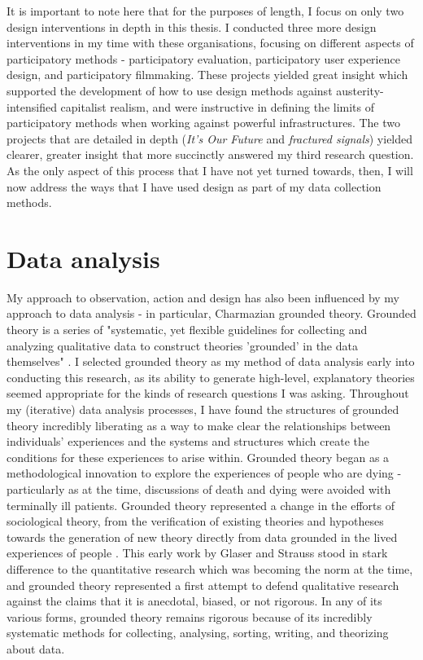 It is important to note here that for the purposes of length, I focus on only two design interventions in depth in this thesis. I conducted three more design interventions in my time with these organisations, focusing on different aspects of participatory methods - participatory evaluation, participatory user experience design, and participatory filmmaking. These projects yielded great insight which supported the development of how to use design methods against austerity-intensified capitalist realism, and were instructive in defining the limits of participatory methods when working against powerful infrastructures. The two projects that are detailed in depth (\textit{It's Our Future} and \textit{fractured signals}) yielded clearer, greater insight that more succinctly answered my third research question. As the only aspect of this process that I have not yet turned towards, then, I will now address the ways that I have used design as part of my data collection methods. 

\section{Data analysis}
\label{sec:3-3-analysis}
My approach to observation, action and design has also been influenced by my approach to data analysis - in particular, Charmazian grounded theory. Grounded theory is a series of "systematic, yet flexible guidelines for collecting and analyzing qualitative data to construct theories 'grounded' in the data themselves" \cite[3]{charmaz_constructing_2006}. I selected grounded theory as my method of data analysis early into conducting this research, as its ability to generate high-level, explanatory theories seemed appropriate for the kinds of research questions I was asking. Throughout my (iterative) data analysis processes, I have found the structures of grounded theory incredibly liberating as a way to make clear the relationships between individuals' experiences and the systems and structures which create the conditions for these experiences to arise within. 
Grounded theory began as a methodological innovation to explore the experiences of people who are dying \citep{glaser_awareness_2017} - particularly as at the time, discussions of death and dying were avoided with terminally ill patients. Grounded theory represented a change in the efforts of sociological theory, from the verification of existing theories and hypotheses towards the generation of new theory directly from data grounded in the lived experiences of people \citep{glaser_discovery_2017}. This early work by Glaser and Strauss stood in stark difference to the quantitative research which was becoming the norm at the time, and grounded theory represented a first attempt to defend qualitative research against the claims that it is anecdotal, biased, or not rigorous. In any of its various forms, grounded theory remains rigorous because of its incredibly systematic methods for collecting, analysing, sorting, writing, and theorizing about data. 


